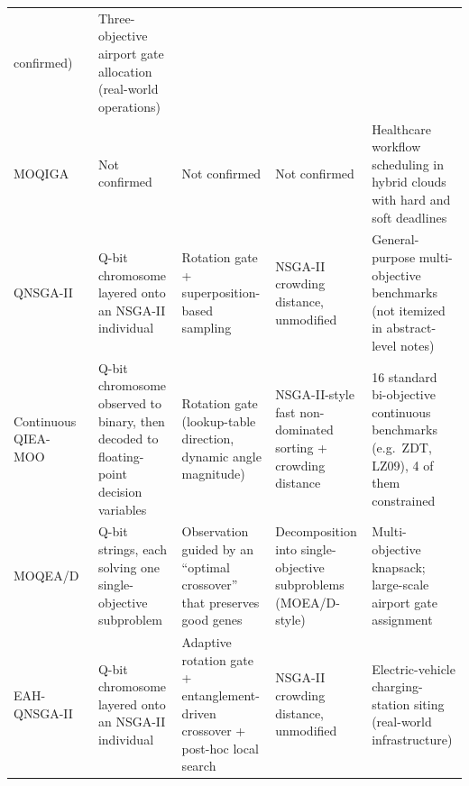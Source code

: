 \begin{xltabular}{\fulllength}{@{}p{2.1cm}XXXX@{}}
      confirmed) &
      Three-objective airport gate allocation (real-world operations) \\
    MOQIGA~\citep{hussain2022moqiga} &
      Not confirmed &
      Not confirmed &
      Not confirmed &
      Healthcare workflow scheduling in hybrid clouds with hard and soft
      deadlines \\
    QNSGA-II~\citep{guzel2022qnsga2} &
      Q-bit chromosome layered onto an NSGA-II individual &
      Rotation gate + superposition-based sampling &
      NSGA-II crowding distance, unmodified &
      General-purpose multi-objective benchmarks (not itemized in
      abstract-level notes) \\
    Continuous QIEA-MOO~\citep{olvera2023continuous} &
      Q-bit chromosome observed to binary, then decoded to
      floating-point decision variables &
      Rotation gate (lookup-table direction, dynamic angle magnitude) &
      NSGA-II-style fast non-dominated sorting + crowding distance &
      16 standard bi-objective continuous benchmarks (e.g.\ ZDT,
      LZ09), 4 of them constrained \\
    MOQEA/D~\citep{deng2024moqead} &
      Q-bit strings, each solving one single-objective subproblem &
      Observation guided by an ``optimal crossover'' that preserves good
      genes &
      Decomposition into single-objective subproblems (MOEA/D-style) &
      Multi-objective knapsack; large-scale airport gate assignment \\
    EAH-QNSGA-II~\citep{kumar2026eahqnsga2} &
      Q-bit chromosome layered onto an NSGA-II individual &
      Adaptive rotation gate + entanglement-driven crossover +
      post-hoc local search &
      NSGA-II crowding distance, unmodified &
      Electric-vehicle charging-station siting (real-world
      infrastructure) \\
\end{xltabular}
\endgroup

